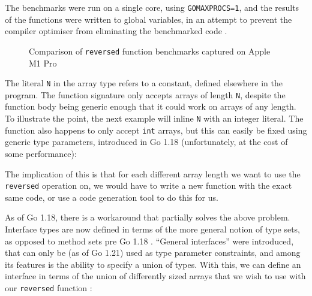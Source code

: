 The benchmarks were run on a single core, using \texttt{GOMAXPROCS=1}, and the
results of the functions were written to global variables, in an attempt to
prevent the compiler optimiser from eliminating the benchmarked code
\autocite{benchPits}.

\begin{figure}
	
	\caption{Comparison of \texttt{reversed} function benchmarks captured on
		Apple M1 Pro}
\end{figure}

The literal \texttt{N} in the array type refers to a constant, defined elsewhere
in the program. The function signature only accepts arrays of length \texttt{N},
despite the function body being generic enough that it could work on arrays of
any length. To illustrate the point, the next example will inline \texttt{N}
with an integer literal. The function also happens to only accept \texttt{int}
arrays, but this can easily be fixed using generic type parameters, introduced
in Go 1.18 (unfortunately, at the cost of some performance):




The implication of this is that for each different array length we want
to use the \texttt{reversed} operation on, we would have to write a new function
with the exact same code, or use a code generation tool to do this for us.

As of Go 1.18, there is a workaround that partially solves the above problem.
Interface types are now defined in terms of the more general notion of type
sets, as opposed to method sets pre Go 1.18 \autocites{spec}{specPre1.18}.
``General interfaces'' were introduced, that can only be (as of Go 1.21) used as
type parameter constraints, and among its features is the ability to specify a
union of types. With this, we can define an interface in terms of the union of
differently sized arrays that we wish to use with our \texttt{reversed} function
\autocite{goArrayProposal}:

